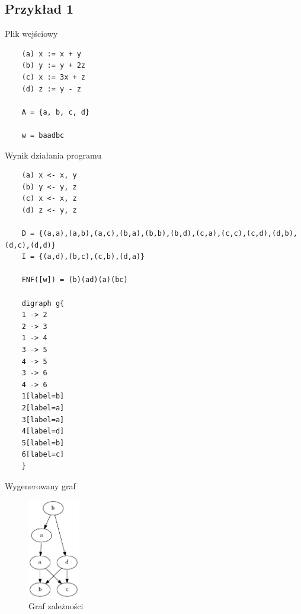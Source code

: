 \documentclass[12pt, letterpaper]{article}
\begin{document}
\subsection*{Przykład 1}
Plik wejściowy
\begin{lstlisting}
    (a) x := x + y
    (b) y := y + 2z
    (c) x := 3x + z
    (d) z := y - z

    A = {a, b, c, d}

    w = baadbc
\end{lstlisting}
Wynik działania programu
\begin{lstlisting}
    (a) x <- x, y
    (b) y <- y, z
    (c) x <- x, z
    (d) z <- y, z

    D = {(a,a),(a,b),(a,c),(b,a),(b,b),(b,d),(c,a),(c,c),(c,d),(d,b),(d,c),(d,d)}
    I = {(a,d),(b,c),(c,b),(d,a)}

    FNF([w]) = (b)(ad)(a)(bc)

    digraph g{
    1 -> 2
    2 -> 3
    1 -> 4
    3 -> 5
    4 -> 5
    3 -> 6
    4 -> 6
    1[label=b]
    2[label=a]
    3[label=a]
    4[label=d]
    5[label=b]
    6[label=c]
    }
\end{lstlisting}
Wygenerowany graf
\begin{figure}[H]
    \centering
    \includegraphics[width=0.2\textwidth]{graph.png}
    \caption{Graf zależności}
\end{figure}
\end{document}
